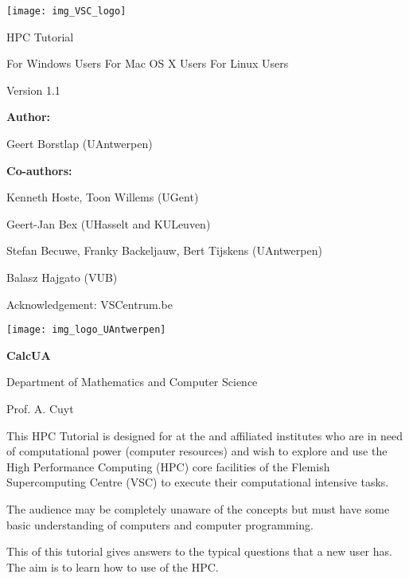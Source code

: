 \clearpage
\vspace*{\fill}
\begin{center}

\texttt{[image: img\_VSC\_logo]}

\university
HPC Tutorial

\ifwindows
For Windows Users
\fi
\ifmac
For Mac OS X Users
\fi
\iflinux
For Linux Users
\fi

Version 1.1

\textbf{Author:} 

Geert Borstlap (UAntwerpen)

\textbf{Co-authors:}

Kenneth Hoste, Toon Willems (UGent)

Geert-Jan Bex (UHasselt and KULeuven)

Stefan Becuwe, Franky Backeljauw, Bert Tijskens (UAntwerpen)

Balasz Hajgato (VUB)

Acknowledgement: VSCentrum.be


\ifantwerpen
\texttt{[image: img\_logo\_UAntwerpen]}

\textbf{CalcUA}

\university

Department of Mathematics and Computer Science

Prof. A. Cuyt
\fi

\end{center}
\vfill %
\clearpage

\textbf{}

This HPC Tutorial is designed for  at the
\strong{\university} and affiliated institutes who are in need of
computational power (computer resources) and wish to explore and use the High
Performance Computing (HPC) core facilities of the Flemish Supercomputing Centre (VSC)
to execute their computational intensive tasks.


The audience may be completely unaware of the \hpc concepts but must have some
basic understanding of computers and computer programming.



This  of this tutorial gives answers to the typical
questions that a new \hpc user has. The aim is to learn how to use of the
HPC.

